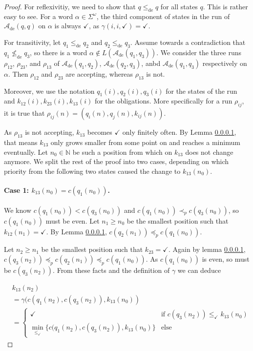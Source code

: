 \begin{proof}
	For reflexivitiy, we need to show that $q \leq_\text{de} q$ for all states $q$. This is rather easy to see. For a word $\alpha \in \Sigma^\omega$, the third component of states in the run of $\mathcal{A}_\text{de}(q, q)$ on $\alpha$ is always $\checkmark$, as $\gamma(i, i, \checkmark) = \checkmark$.
	
	For transitivity, let $q_1 \leq_\text{de} q_2$ and $q_2 \leq_\text{de} q_3$. Assume towards a contradiction that $q_1 \not\leq_\text{de} q_3$, so there is a word $\alpha \notin L(\mathcal{A}_\text{de}(q_1, q_3))$. We consider the three runs $\rho_{12}$, $\rho_{23}$, and $\rho_{13}$ of $\mathcal{A}_\text{de}(q_1, q_2)$, $\mathcal{A}_\text{de}(q_2, q_3)$, anbd $\mathcal{A}_\text{de}(q_1, q_3)$ respectively on $\alpha$. Then $\rho_{12}$ and $\rho_{23}$ are accepting, whereas $\rho_{13}$ is not. 
	
	Moreover, we use the notation $q_1(i), q_2(i), q_3(i)$ for the states of the run and $k_{12}(i), k_{23}(i), k_{13}(i)$ for the obligations. More specifically for a run $\rho_{ij}$, it is true that $\rho_{ij}(n) = (q_i(n), q_j(n), k_{ij}(n))$.
	
	As $\rho_{13}$ is not accepting, $k_{13}$ becomes $\checkmark$ only finitely often. By Lemma \ref{}, that means $k_{13}$ only grows smaller from some point on and reaches a minimum eventually. Let $n_0 \in \mathbb{N}$ be such a position from which on $k_{13}$ does not change anymore. We split the rest of the proof into two cases, depending on which priority from the following two states caused the change to $k_{13}(n_0)$.
	
	\paragraph{Case 1: $k_{13}(n_0) = c(q_1(n_0))$.} We know $c(q_1(n_0)) < c(q_3(n_0))$ and $c(q_1(n_0)) \prec_p c(q_3(n_0))$, so $c(q_1(n_0))$ must be even. Let $n_1 \geq n_0$ be the smallest position such that $k_{12}(n_1) = \checkmark$. By Lemma \ref{}, $c(q_2(n_1)) \preceq_p c(q_1(n_0))$. 
	
	Let $n_2 \geq n_1$ be the smallest position such that $k_{23} = \checkmark$. Again by lemma \ref{}, $c(q_3(n_2)) \preceq_p c(q_2(n_1)) \preceq_p c(q_1(n_0))$. As $c(q_1(n_0))$ is even, so must be $c(q_3(n_2))$. From these facts and the definition of $\gamma$ we can deduce 
	
	\begin{align*}
		& k_{13}(n_2) \\
		&= \gamma(c(q_1(n_2), c(q_3(n_2)), k_{13}(n_0)) \\
		&= \begin{cases}
		\checkmark & \text{if } c(q_3(n_2)) \leq_\checkmark k_{13}(n_0) \\
		\min_{\leq_\checkmark} \{c(q_1(n_2), c(q_3(n_2)), k_{13}(n_0)\} & \text{else}
	\end{cases}
	\end{align*}
	

\end{proof}
